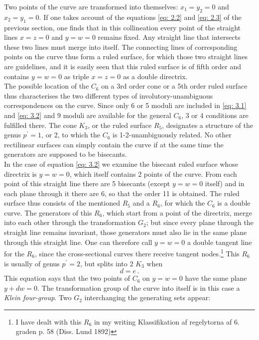 \documentclass[leqno]{article}
\begin{document}
Two points of the curve are transformed into themselves: $x_1=y_2=0$ and $x_2=y_1=0$. If one takes account of the equations \eqref{eq: 2.2} and \eqref{eq: 2.3} of the previous section, one finds that in this collineation every point of the straight lines $x=z=0$ and $y=w=0$ remains fixed. Any straight line that intersects these two lines must merge into itself. The connecting lines of corresponding points on the curve thus form a ruled surface, for which those two straight lines are guidelines, and it is easily seen that this ruled surface is of fifth order and contains $y=w=0$ as triple $x=z=0 $ as a double directrix. \\
The possible location of the $C_6$ on a 3rd order cone or a 5th order ruled surface thus characterises the two different types of involutory-unambiguous correspondences on the curve. Since only 6 or 5 moduli are included in \eqref{eq: 3.1} and \eqref{eq: 3.2} and 9 moduli are available for the general $C_6$, 3 or 4 conditions are fulfilled there. The cone $K_3$, or the ruled surface $R_5$, designates a structure of the genus $p^\prime=1$, or 2, to which the $C_6$ is 1-2-unambiguously related. No other rectilinear surfaces can simply contain the curve if at the same time the generators are supposed to be bisecants. \\
In the case of equation \eqref{eq: 3.2} we examine the bisecant ruled surface whose directrix is $y=w=0$, which itself contains 2 points of the curve. From each point of this straight line there are 5 bisecants (except $y=w=0$ itself) and in each plane through it there are 6, so that the order 11 is obtained. The ruled surface thus consists of the mentioned $R_5$ and a $R_6$, for which the $C_6$ is a double curve. The generators of this $R_6$, which start from a point of the directrix, merge into each other through the transformation $G_2$; but since every plane through the straight line remains invariant, those generators must also lie in the same plane through this straight line. One can therefore call $y=w=0$ a double tangent line for the $R_6$, since the cross-sectional curves there receive tangent nodes.\footnote{I have dealt with this $R_6$ in my writing \guillemotright Klassifikation af regelytorna af 6. graden\guillemotright{} p. 58 (Diss. Lund 1892)} This $R_6$ is usually of genus $p^\prime=2$, but splits into 2 $K_3$ when 
\begin{equation}\label{eq: 3.3}
d=e \, . \tag{3}
\end{equation}
This equation says that the two points of $C_6$ on $y=w=0$ have the same plane $y+dw=0$. The transformation group of the curve into itself is in this case a \textit{Klein four-group}. Two $G_2$ interchanging the generating sets appear:
\end{document}
